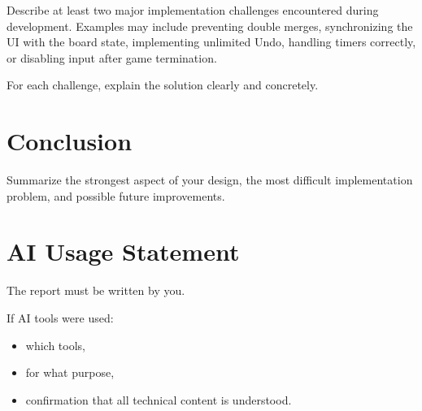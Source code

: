 \documentclass[a4paper,12pt]{article}
\begin{document}
Describe at least two major implementation challenges encountered during development. Examples may include preventing double merges, synchronizing the UI with the board state, implementing unlimited Undo, handling timers correctly, or disabling input after game termination.

For each challenge, explain the solution clearly and concretely.

\section{Conclusion}

Summarize the strongest aspect of your design, the most difficult implementation problem, and possible future improvements.

\section*{AI Usage Statement}

The report must be written by you.

If AI tools were used:
\begin{itemize}
\item which tools,
\item for what purpose,
\item confirmation that all technical content is understood.
\end{itemize}
\end{document}
